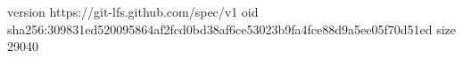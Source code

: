 version https://git-lfs.github.com/spec/v1
oid sha256:309831ed520095864af2fcd0bd38af6ce53023b9fa4fce88d9a5ee05f70d51ed
size 29040
